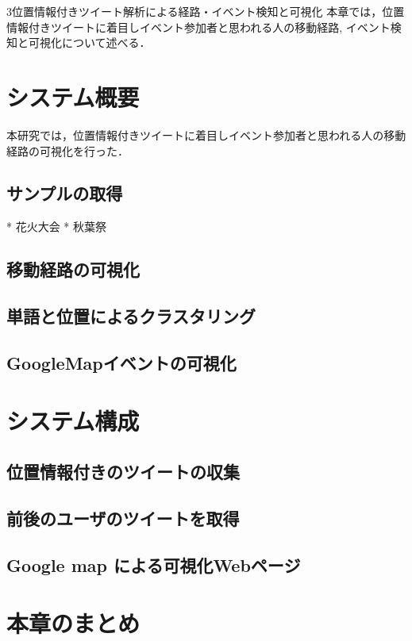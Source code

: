 \chapterhead
{3}{位置情報付きツイート解析による経路・イベント検知と可視化}
{本章では，位置情報付きツイートに着目しイベント参加者と思われる人の移動経路, イベント検知と可視化について述べる．}


\section{システム概要}
本研究では，位置情報付きツイートに着目しイベント参加者と思われる人の移動経路の可視化を行った．

\subsection{サンプルの取得}
* 花火大会
* 秋葉祭
\subsection{移動経路の可視化}
\subsection{単語と位置によるクラスタリング}
\subsection{GoogleMapイベントの可視化}

\section{システム構成}
\subsection{位置情報付きのツイートの収集}
\subsection{前後のユーザのツイートを取得}
\subsection{Google map による可視化Webページ}

\newpage

\section{本章のまとめ}





\newpage
